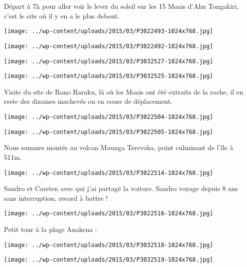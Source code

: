  Départ à 7h pour aller voir le lever du soleil sur les 15 Moais d'Ahu Tongakiri, c'est le site où il y en a le plus debout.
\begin{center} \texttt{[image: ../wp-content/uploads/2015/03/P3022493-1024x768.jpg]} \end{center}
\begin{center} \texttt{[image: ../wp-content/uploads/2015/03/P3022492-1024x768.jpg]} \end{center}
\begin{center} \texttt{[image: ../wp-content/uploads/2015/03/P3032527-1024x768.jpg]} \end{center}
\begin{center} \texttt{[image: ../wp-content/uploads/2015/03/P3032525-1024x768.jpg]} \end{center}

Visite du site de Rano Raraku, là où les Moais ont été extraits de la roche, il en reste des dizaines inachevés ou en cours de déplacement.
\begin{center} \texttt{[image: ../wp-content/uploads/2015/03/P3022504-1024x768.jpg]} \end{center}
\begin{center} \texttt{[image: ../wp-content/uploads/2015/03/P3022505-1024x768.jpg]} \end{center}

 Nous sommes montés au volcan Maunga Terevaka, point culminant de l'île à 511m.
\begin{center} \texttt{[image: ../wp-content/uploads/2015/03/P3022514-1024x768.jpg]} \end{center}

\pagebreak
 Sandro et Carsten avec qui j'ai partagé la voiture. Sandro voyage depuis 8 ans sans interruption, record à battre !
\begin{center} \texttt{[image: ../wp-content/uploads/2015/03/P3022516-1024x768.jpg]} \end{center}

Petit tour à la plage Anakena :
\begin{center} \texttt{[image: ../wp-content/uploads/2015/03/P3032518-1024x768.jpg]} \end{center}
\begin{center} \texttt{[image: ../wp-content/uploads/2015/03/P3032519-1024x768.jpg]} \end{center}


